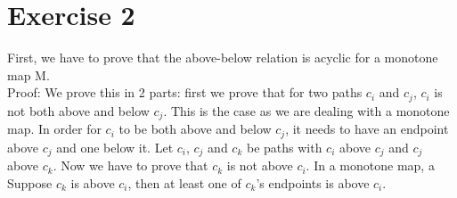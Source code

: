 \documentclass[a4paper,11pt]{article}
\begin{document}
\section*{Exercise 2}
First, we have to prove that the above-below relation is acyclic for a monotone map M.\\
Proof: We prove this in 2 parts: first we prove that for two paths $c_i$ and $c_j$, $c_i$ is not both above and below $c_j$. This is the case as we are dealing with a monotone map. In order for $c_i$ to be both above and below $c_j$, it needs to have an endpoint above $c_j$ and one below it. 
Let $c_i$, $c_j$ and $c_k$ be paths with $c_i$ above $c_j$ and $c_j$ above $c_k$. Now we have to prove that $c_k$ is not above $c_i$. In a monotone map, a Suppose $c_k$ is above $c_i$, then at least one of $c_k$'s endpoints is above $c_i$. 
\end{document}
